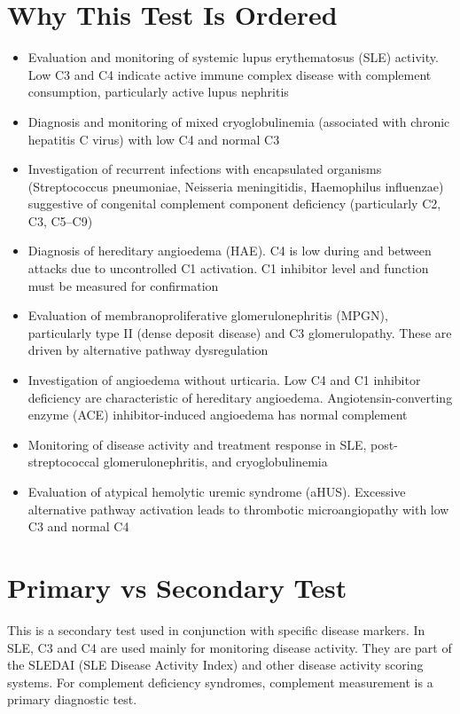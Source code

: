 \section*{Why This Test Is Ordered}
\begin{itemize}
  \item Evaluation and monitoring of systemic lupus erythematosus (SLE) activity. Low C3 and C4 indicate active immune complex disease with complement consumption, particularly active lupus nephritis \cite{truedsson2007complement}
  \item Diagnosis and monitoring of mixed cryoglobulinemia (associated with chronic hepatitis C virus) with low C4 and normal C3
  \item Investigation of recurrent infections with encapsulated organisms (Streptococcus pneumoniae, Neisseria meningitidis, Haemophilus influenzae) suggestive of congenital complement component deficiency (particularly C2, C3, C5--C9)
  \item Diagnosis of hereditary angioedema (HAE). C4 is low during and between attacks due to uncontrolled C1 activation. C1 inhibitor level and function must be measured for confirmation
  \item Evaluation of membranoproliferative glomerulonephritis (MPGN), particularly type II (dense deposit disease) and C3 glomerulopathy. These are driven by alternative pathway dysregulation
  \item Investigation of angioedema without urticaria. Low C4 and C1 inhibitor deficiency are characteristic of hereditary angioedema. Angiotensin-converting enzyme (ACE) inhibitor-induced angioedema has normal complement
  \item Monitoring of disease activity and treatment response in SLE, post-streptococcal glomerulonephritis, and cryoglobulinemia
  \item Evaluation of atypical hemolytic uremic syndrome (aHUS). Excessive alternative pathway activation leads to thrombotic microangiopathy with low C3 and normal C4
\end{itemize}

\section*{Primary vs Secondary Test}
This is a secondary test used in conjunction with specific disease markers. In SLE, C3 and C4 are used mainly for monitoring disease activity. They are part of the SLEDAI (SLE Disease Activity Index) and other disease activity scoring systems. For complement deficiency syndromes, complement measurement is a primary diagnostic test.

